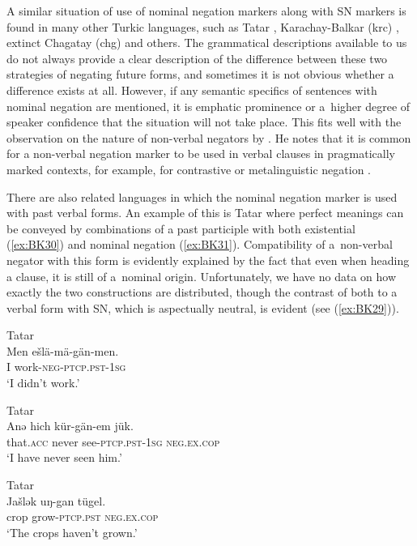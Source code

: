 \documentclass[output=paper]{langsci/langscibook}
\begin{document}
A similar situation of use of nominal negation markers along with SN markers is found in many other Turkic languages, such as Tatar \citep{poppe1961a}, Karachay-Balkar (krc) \citep{seegmiller1996a}, extinct Chagatay (chg) \citep{bodrogligeti2001a} and others. The grammatical descriptions available to us do not always provide a clear description of the difference between these two strategies of negating future forms, and sometimes it is not obvious whether a difference exists at all. However, if any semantic specifics of sentences with nominal negation are mentioned, it is emphatic prominence or a higher degree of speaker confidence that the situation will not take place. This fits well with the observation on the nature of non-verbal negators by \citet{Horn1989}. He notes that it is common for a non-verbal negation marker to be used in verbal clauses in pragmatically marked contexts, for example, for contrastive or metalinguistic negation \citep[446, 451–452]{Horn1989}.

There are also related languages in which the nominal negation marker is used with past verbal forms. An example of this is Tatar where perfect meanings can be conveyed by combinations of a past participle with both existential (\ref{ex:BK30}) and nominal negation (\ref{ex:BK31}). Compatibility of a non-verbal negator with this form is evidently explained by the fact that even when heading a clause, it is still of a nominal origin. Unfortunately, we have no data on how exactly the two constructions are distributed, though the contrast of both to a verbal form with SN, which is aspectually neutral, is evident (see (\ref{ex:BK29})).

\ea Tatar \citep[69]{poppe1961a} \label{ex:BK29}\\
	\gll Men	ešlä-mä-gän-men.\\
	I	work-\textsc{neg-ptcp.pst-1sg}\\
	\glt `I didn’t work.'
\z

\ea Tatar \citep[126]{poppe1961a} \label{ex:BK30}\\
	\gll Anǝ		hich		kür-gän-em			jük.\\
	that.\textsc{acc}	never		see-\textsc{ptcp.pst-1sg}	\textsc{neg.ex.cop}\\
	\glt `I have never seen him.'
\z

\ea Tatar \citep[126]{poppe1961a} \label{ex:BK31}\\
	\gll Jašlǝk		uŋ-gan			tügel.\\
	crop		grow-\textsc{ptcp.pst}	\textsc{neg.ex.cop}\\
	\glt `The crops haven’t grown.'
\z
\end{document}
